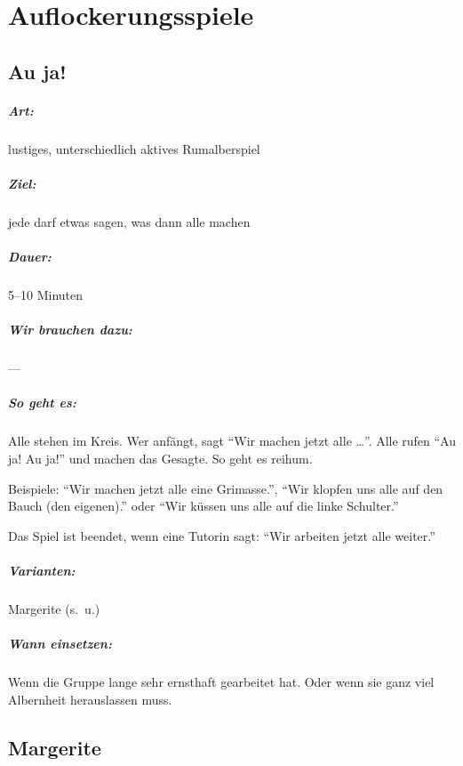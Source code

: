 \chapter{Auflockerungsspiele}

\section{Au ja!}
\paragraph{Art:} lustiges, unterschiedlich aktives Rumalberspiel
\paragraph{Ziel:} jede darf etwas sagen, was dann alle machen
\paragraph{Dauer:} 5--10 Minuten
\paragraph{Wir brauchen dazu:} ---
\paragraph{So geht es:} Alle stehen im Kreis. Wer anfängt, sagt "`Wir machen jetzt alle \ldots"'. Alle rufen "`Au ja! Au ja!"' und machen das Gesagte. So geht es reihum.

Beispiele: "`Wir machen jetzt alle eine Grimasse."', "`Wir klopfen uns alle auf den Bauch (den eigenen)."' oder "`Wir küssen uns alle auf die linke Schulter."'

Das Spiel ist beendet, wenn eine Tutorin sagt: "`Wir arbeiten jetzt alle weiter."'
\paragraph{Varianten:} Margerite (s.~u.)
\paragraph{Wann einsetzen:} Wenn die Gruppe lange sehr ernsthaft gearbeitet hat. Oder wenn sie ganz viel Albernheit herauslassen muss.

\section{Margerite}

